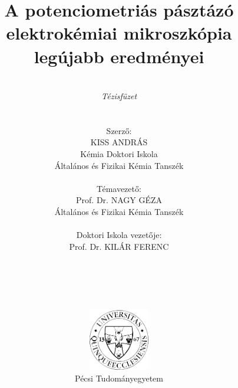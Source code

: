 \pagestyle{empty}

\title{\textbf{A potenciometriás pásztázó elektrokémiai mikroszkópia legújabb eredményei}}

\author{\\ \emph{Tézisfüzet} \\ \\ \\ Szerző: \\ KISS ANDRÁS \\ Kémia Doktori Iskola \\ Általános és Fizikai Kémia Tanszék \\ \\ Témavezető: \\ Prof. Dr. NAGY GÉZA
\\ Általános és Fizikai Kémia Tanszék \\
\\ Doktori Iskola vezetője: \\
Prof. Dr. KILÁR FERENC\\
 \\
\\ \\ \\ \\
\includegraphics[width=0.2\textwidth]{img/pte_logo.eps} \\
Pécsi Tudományegyetem}
\maketitle

\thispagestyle{empty}
\large
\setcounter{tocdepth}{4}
\thispagestyle{empty}
\thispagestyle{empty}
